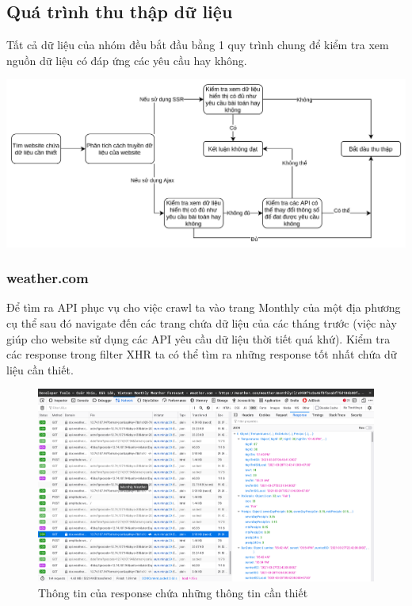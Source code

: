 \documentclass{article}
\begin{document}
\subsection{Quá trình thu thập dữ liệu}

Tất cả dữ liệu của nhóm đều bắt đầu bằng 1 quy trình chung để kiểm tra xem nguồn dữ liệu có đáp ứng các yêu cầu hay không.

\includegraphics[width=6in]{images/process.png}

\subsubsection{weather.com}
\qquad Để tìm ra API phục vụ cho việc crawl ta vào trang Monthly của một địa phương cụ thể sau đó navigate đến các trang chứa dữ liệu của các tháng trước (việc này giúp cho website sử dụng các API yêu cầu dữ liệu thời tiết quá khứ). Kiểm tra các response trong filter XHR ta có thể tìm ra những response tốt nhất chứa dữ liệu cần thiết.

\begin{figure}[H]
	\centering
	\includegraphics[width=6in]{images/inspect.png}
	\caption{Thông tin của response chứa những thông tin cần thiết}
\end{figure}
\end{document}
